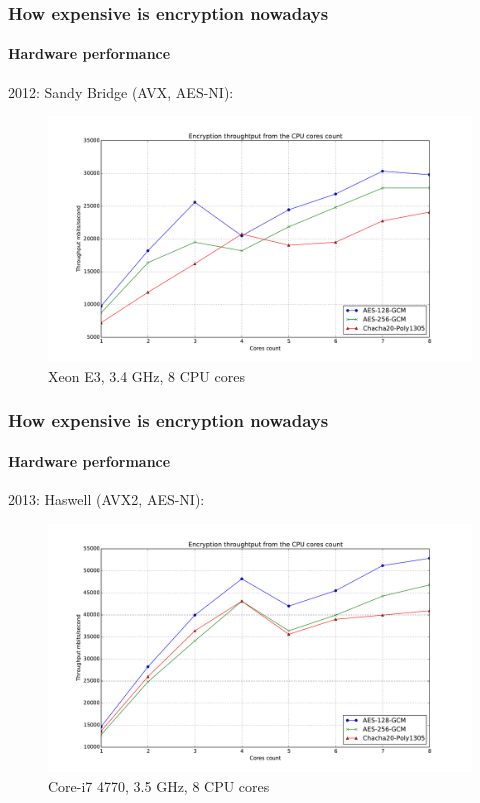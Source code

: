 \documentclass[11pt,t]{beamer}
\begin{document}
\begin{frame}
\frametitle{How expensive is encryption nowadays}
\framesubtitle{Hardware performance}
2012: Sandy Bridge (AVX, AES-NI):
\begin{figure}[H]
\includegraphics[height=0.6\textheight]{perf-e3.pdf}
\caption{Xeon E3, 3.4 GHz, 8 CPU cores}
\end{figure}
\end{frame}

\begin{frame}
\frametitle{How expensive is encryption nowadays}
\framesubtitle{Hardware performance}
2013: Haswell (AVX2, AES-NI):
\begin{figure}[H]
\includegraphics[height=0.6\textheight]{perf-i7.pdf}
\caption{Core-i7 4770, 3.5 GHz, 8 CPU cores}
\end{figure}
\end{frame}
\end{document}

